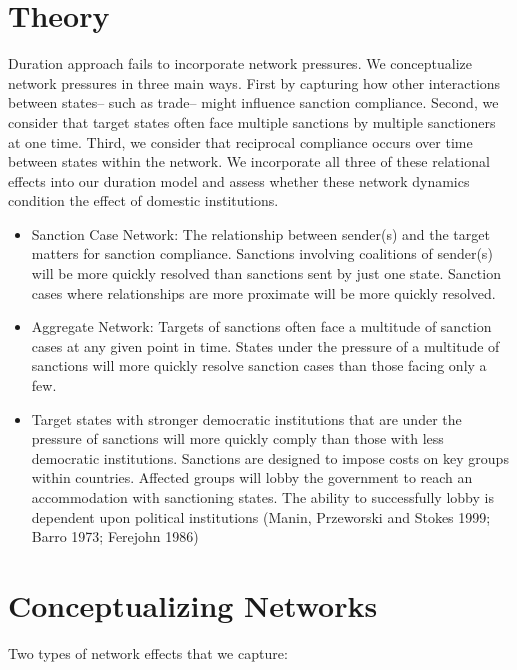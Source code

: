 \section{Theory}
\label{theory}

Duration approach fails to incorporate network pressures. We conceptualize network pressures in three main ways. First by capturing how other interactions between states-- such as trade-- might influence sanction compliance. Second, we consider that target states often face multiple sanctions by multiple sanctioners at one time. Third, we consider that reciprocal compliance occurs over time between states within the network. We incorporate all three of these relational effects into our duration model and assess whether these network dynamics condition the effect of domestic institutions. 

\begin{itemize}
\item Sanction Case Network: The relationship between sender(s) and the target matters for sanction compliance. Sanctions involving coalitions of sender(s) will be more quickly resolved than sanctions sent by just one state. Sanction cases where relationships are more proximate will be more quickly resolved.
\item Aggregate Network: Targets of sanctions often face a multitude of sanction cases at any given point in time. States under the pressure of a multitude of sanctions will more quickly resolve sanction cases than those facing only a few.
\item Target states with stronger democratic institutions that are under the pressure of sanctions will more quickly comply than those with less democratic institutions. Sanctions are designed to impose costs on key groups within countries. Affected groups will lobby the government to reach an accommodation with sanctioning states. The ability to successfully lobby is dependent upon political institutions (Manin, Przeworski and Stokes 1999; Barro 1973; Ferejohn 1986)
\end{itemize}

\section{Conceptualizing Networks}
Two types of network effects that we capture:

